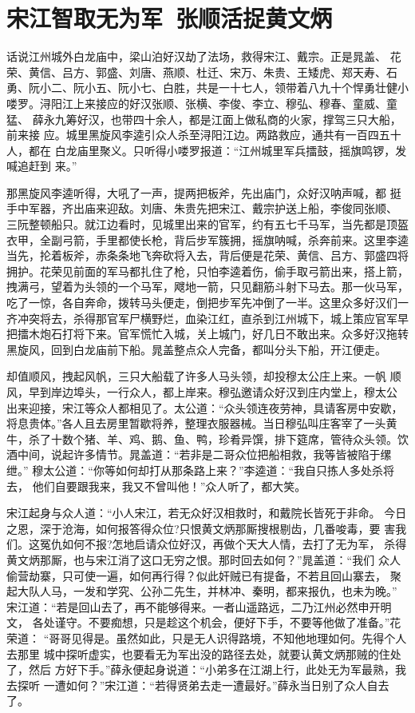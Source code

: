 \chapter{宋江智取无为军~张顺活捉黄文炳}

话说江州城外白龙庙中，梁山泊好汉劫了法场，救得宋江、戴宗。正是晁盖、
花荣、黄信、吕方、郭盛、刘唐、燕顺、杜迁、宋万、朱贵、王矮虎、郑天寿、石
勇、阮小二、阮小五、阮小七、白胜，共是一十七人，领带着八九十个悍勇壮健小
喽罗。浔阳江上来接应的好汉张顺、张横、李俊、李立、穆弘、穆春、童威、童猛、
薛永九筹好汉，也带四十余人，都是江面上做私商的火家，撑驾三只大船，前来接
应。城里黑旋风李逵引众人杀至浔阳江边。两路救应，通共有一百四五十人，都在
白龙庙里聚义。只听得小喽罗报道：“江州城里军兵擂鼓，摇旗鸣锣，发喊追赶到
来。”

那黑旋风李逵听得，大吼了一声，提两把板斧，先出庙门，众好汉呐声喊，都
挺手中军器，齐出庙来迎敌。刘唐、朱贵先把宋江、戴宗护送上船，李俊同张顺、
三阮整顿船只。就江边看时，见城里出来的官军，约有五七千马军，当先都是顶盔
衣甲，全副弓箭，手里都使长枪，背后步军簇拥，摇旗呐喊，杀奔前来。这里李逵
当先，抡着板斧，赤条条地飞奔砍将入去，背后便是花荣、黄信、吕方、郭盛四将
拥护。花荣见前面的军马都扎住了枪，只怕李逵着伤，偷手取弓箭出来，搭上箭，
拽满弓，望着为头领的一个马军，飕地一箭，只见翻筋斗射下马去。那一伙马军，
吃了一惊，各自奔命，拨转马头便走，倒把步军先冲倒了一半。这里众多好汉们一
齐冲突将去，杀得那官军尸横野烂，血染江红，直杀到江州城下，城上策应官军早
把擂木炮石打将下来。官军慌忙入城，关上城门，好几日不敢出来。众多好汉拖转
黑旋风，回到白龙庙前下船。晁盖整点众人完备，都叫分头下船，开江便走。

却值顺风，拽起风帆，三只大船载了许多人马头领，却投穆太公庄上来。一帆
顺风，早到岸边埠头，一行众人，都上岸来。穆弘邀请众好汉到庄内堂上，穆太公
出来迎接，宋江等众人都相见了。太公道：“众头领连夜劳神，具请客房中安歇，
将息贵体。”各人且去房里暂歇将养，整理衣服器械。当日穆弘叫庄客宰了一头黄
牛，杀了十数个猪、羊、鸡、鹅、鱼、鸭，珍肴异馔，排下筵席，管待众头领。饮
酒中间，说起许多情节。晁盖道：“若非是二哥众位把船相救，我等皆被陷于缧绁。”
穆太公道：“你等如何却打从那条路上来？”李逵道：“我自只拣人多处杀将去，
他们自要跟我来，我又不曾叫他！”众人听了，都大笑。

宋江起身与众人道：“小人宋江，若无众好汉相救时，和戴院长皆死于非命。
今日之恩，深于沧海，如何报答得众位?只恨黄文炳那厮搜根剔齿，几番唆毒，要
害我们。这冤仇如何不报?怎地启请众位好汉，再做个天大人情，去打了无为军，
杀得黄文炳那厮，也与宋江消了这口无穷之恨。那时回去如何？”晁盖道：“我们
众人偷营劫寨，只可使一遍，如何再行得？似此奸贼已有提备，不若且回山寨去，
聚起大队人马，一发和学究、公孙二先生，并林冲、秦明，都来报仇，也未为晚。”
宋江道：“若是回山去了，再不能够得来。一者山遥路远，二乃江州必然申开明文，
各处谨守。不要痴想，只是趁这个机会，便好下手，不要等他做了准备。”花荣道：
“哥哥见得是。虽然如此，只是无人识得路境，不知他地理如何。先得个人去那里
城中探听虚实，也要看无为军出没的路径去处，就要认黄文炳那贼的住处了，然后
方好下手。”薛永便起身说道：“小弟多在江湖上行，此处无为军最熟，我去探听
一遭如何？”宋江道：“若得贤弟去走一遭最好。”薛永当日别了众人自去了。

